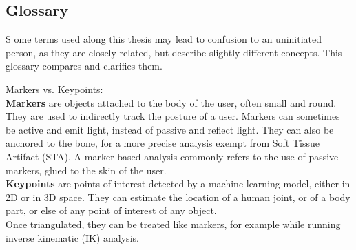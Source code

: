 
{} \mtcaddchapter
\label{Ann:gloss}

\vspace*{-1.6cm}
\begin{flushright}
\section*{\fontsize{20pt}{20pt}\selectfont\textnormal{Glossary}}
\end{flushright}
\vspace{-0.2cm}


\chead[\fancyplain{}{}]
      {\fancyplain{}{}}
\lfoot[\fancyplain{}{}]
      {\fancyplain{}{}}
\cfoot[\fancyplain{}{\thepage}]
      {\fancyplain{}{\thepage}}
\rfoot[\fancyplain{}{}]%
     {\fancyplain{}{\scriptsize}}


\lettrine[lines=1]{S}{ }ome terms used along this thesis may lead to confusion to an uninitiated person, as they are closely related, but describe slightly different concepts. This glossary compares and clarifies them.

\vspace*{1cm}

\noindent\underline{Markers vs. Keypoints:}\\
\textbf{Markers} are objects attached to the body of the user, often small and round. They are used to indirectly track the posture of a user. Markers can sometimes be active and emit light, instead of passive and reflect light. They can also be anchored to the bone, for a more precise analysis exempt from Soft Tissue Artifact (STA). A marker-based analysis commonly refers to the use of passive markers, glued to the skin of the user.\\
\textbf{Keypoints} are points of interest detected by a machine learning model, either in 2D or in 3D space. They can estimate the location of a human joint, or of a body part, or else of any point of interest of any object.\\
Once triangulated, they can be treated like markers, for example while running inverse kinematic (IK) analysis.

